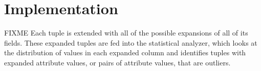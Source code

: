 \section{Implementation}
\label{sec:implementation}

FIXME Each tuple is extended with all of the possible expansions of all of its fields.
These expanded tuples are fed into the statistical analyzer, which looks at the distribution of values in each expanded column and identifies tuples with expanded attribute values, or pairs of attribute values, that are outliers.




